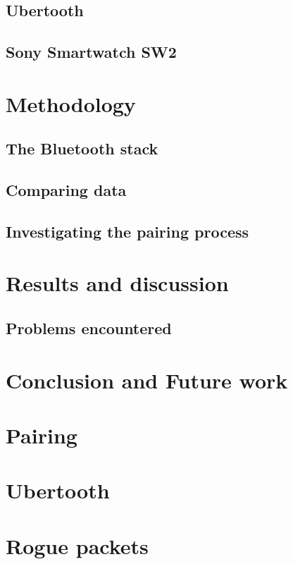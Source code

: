 \documentclass{article}
\begin{document}
	\subsection{Ubertooth}
	\subsection{Sony Smartwatch SW2} %
	
\newpage
\section{Methodology}		%
 
	\subsection{The Bluetooth stack}
				
		\newpage
	\subsection{Comparing data}	%
		
	
	\subsection{Investigating the pairing process}
		
\newpage
\section{Results and discussion}

		
		\subsection{Problems encountered}
		
\newpage
\section{Conclusion and Future work}


\newpage

\vspace*{2\baselineskip} %


{}


\appendix
\section{Pairing}
\label{app:pairing}
\section{Ubertooth}
\label{app:ubertooth}
\section{Rogue packets}
\label{app:roguepackets}

\end{document}
